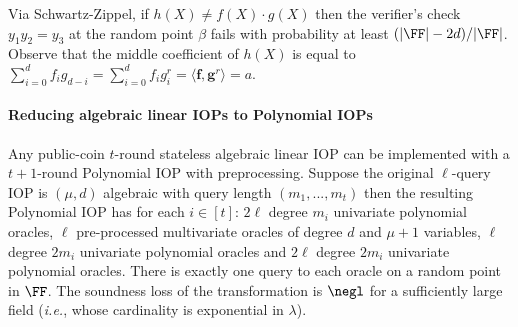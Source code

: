 Via Schwartz-Zippel, if $h(X) \neq f(X) \cdot g(X)$ then the verifier's check $y_1 y_2 = y_3$ at the random point $\beta$ fails with probability at least $(|\FF| - 2d)/|\FF|$. %
Observe that the middle coefficient of $h(X)$ is equal to $\sum_{i=0}^d f_i g_{d-i} = \sum_{i=0}^d f_i g^r_i = \langle \mathbf{f}, \mathbf{g}^r \rangle = a$.

\paragraph{Reducing algebraic linear IOPs to Polynomial IOPs} 
\label{sec:algebraicIOP}

\begin{theorem}\label{thm:algebraicIOPcompiler}
Any public-coin $t$-round stateless algebraic linear IOP can be implemented with a $t+1$-round Polynomial IOP with preprocessing. Suppose the original $\ell$-query IOP is $(\mu,d)$ algebraic with query length $(m_1,...,m_t)$ then the resulting Polynomial IOP has for each $i \in [t]$: $2\ell$ degree $m_i$ univariate polynomial oracles, $\ell$ pre-processed multivariate oracles of degree $d$ and $\mu+1$ variables, $\ell$ degree $2m_i$ univariate polynomial oracles %
and $2\ell$ degree $2m_i$ univariate polynomial oracles. %
There is exactly one query to each oracle on a random point in $\FF$. The soundness loss of the transformation is $\negl$ for a sufficiently large field (\emph{i.e.}, whose cardinality is exponential in $\lambda$).
\end{theorem}

